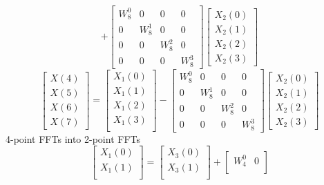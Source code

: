 \documentclass[journal,12pt,twocolumn]{IEEEtran}
\renewcommand\thesection{\arabic{section}}
\begin{document}
\begin{enumerate}[label=\arabic*.,ref=\thesection.\theenumi]
\begin{equation}
+
\begin{bmatrix}
W^{0}_{8} & 0 & 0 & 0\\
0 & W^{1}_{8} & 0 & 0\\
0 & 0 & W^{2}_{8} & 0\\
0 & 0 & 0 & W^{3}_{8}
\end{bmatrix}
\begin{bmatrix}
X_{2}(0) \\ 
X_{2}(1) \\ 
X_{2}(2) \\
X_{2}(3)
\end{bmatrix}
\label{eq:8-low}
\end{equation}
\begin{equation}
\begin{bmatrix}
X(4) \\ 
X(5) \\ 
X(6) \\ 
X(7)
\end{bmatrix}
=
\begin{bmatrix}
X_{1}(0) \\ 
X_{1}(1)\\ 
X_{1}(2)\\
X_{1}(3)\\
\end{bmatrix}
-
\begin{bmatrix}
W^{0}_{8} & 0 & 0 & 0\\
0 & W^{1}_{8} & 0 & 0\\
0 & 0 & W^{2}_{8} & 0\\
0 & 0 & 0 & W^{3}_{8}
\end{bmatrix}
\begin{bmatrix}
X_{2}(0) \\ 
X_{2}(1) \\ 
X_{2}(2) \\
X_{2}(3)
\end{bmatrix}
\label{eq:8-high}
\end{equation}
4-point FFTs into 2-point FFTs
\begin{equation}
\begin{bmatrix}
X_{1}(0) \\ 
X_{1}(1)\\ 
\end{bmatrix}
=
\begin{bmatrix}
X_{3}(0) \\ 
X_{3}(1)\\ 
\end{bmatrix}
+
\begin{bmatrix}
W^{0}_{4} & 0\\

\end{bmatrix}
\end{equation}
\end{enumerate}
\end{document}
